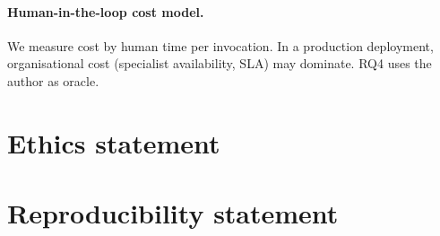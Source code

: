 \paragraph{Human-in-the-loop cost model.} We measure cost by human time per invocation. In a production deployment, organisational cost (specialist availability, SLA) may dominate. RQ4 uses the author as oracle.

\section{Ethics statement}
\label{app:ethics}

\section{Reproducibility statement}
\label{app:reproducibility}
